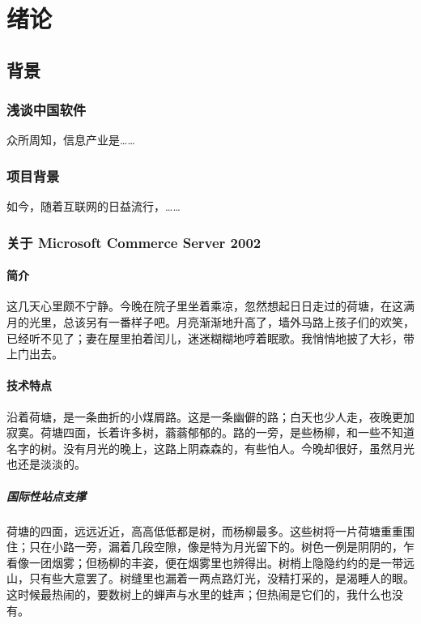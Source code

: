 \documentclass[printMode]{ecnuthesis}
\begin{document}
\chapter{绪论}

\section{背景}

\subsection{浅谈中国软件}

众所周知，信息产业是……

\subsection{项目背景}

如今，随着互联网的日益流行，……

\subsection{关于 Microsoft Commerce Server 2002}

\subsubsection{简介}

这几天心里颇不宁静。今晚在院子里坐着乘凉，忽然想起日日走过的荷塘，在这满月的光里，总该另有一番样子吧。月亮渐渐地升高了，墙外马路上孩子们的欢笑，已经听不见了；妻在屋里拍着闰儿，迷迷糊糊地哼着眠歌。我悄悄地披了大衫，带上门出去。

\subsubsection{技术特点}

沿着荷塘，是一条曲折的小煤屑路。这是一条幽僻的路；白天也少人走，夜晚更加寂寞。荷塘四面，长着许多树，蓊蓊郁郁的。路的一旁，是些杨柳，和一些不知道名字的树。没有月光的晚上，这路上阴森森的，有些怕人。今晚却很好，虽然月光也还是淡淡的。

\paragraph{国际性站点支撑}

荷塘的四面，远远近近，高高低低都是树，而杨柳最多。这些树将一片荷塘重重围住；只在小路一旁，漏着几段空隙，像是特为月光留下的。树色一例是阴阴的，乍看像一团烟雾；但杨柳的丰姿，便在烟雾里也辨得出。树梢上隐隐约约的是一带远山，只有些大意罢了。树缝里也漏着一两点路灯光，没精打采的，是渴睡人的眼。这时候最热闹的，要数树上的蝉声与水里的蛙声；但热闹是它们的，我什么也没有。
\end{document}
